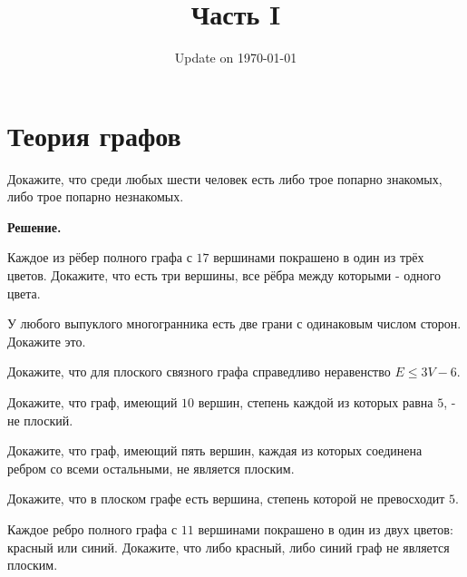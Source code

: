 \documentclass[12pt]{article}
\begin{document}
\fontsize{12}{12}\selectfont

\title{\bf \huge Часть I}
\date{Update on \today}
\maketitle 



\section*{Теория графов}

\begin{task}
Докажите, что среди любых шести человек есть либо трое попарно знакомых, либо трое попарно незнакомых.
\end{task}

\noindent\textbf{Решение.} 

\begin{task}
Каждое из рёбер полного графа с $17$ вершинами покрашено в один из трёх цветов. Докажите, что есть три вершины, все рёбра между которыми - одного цвета.
\end{task}

\begin{task}
У любого выпуклого многогранника есть две грани с одинаковым числом сторон. Докажите это.
\end{task}

\begin{task}
Докажите, что для плоского связного графа справедливо неравенство  $E \leqslant  3V - 6$.
\end{task}

\begin{task}
Докажите, что граф, имеющий $10$ вершин, степень каждой из которых равна $5$, - не плоский.    
\end{task}

\begin{task}
Докажите, что граф, имеющий пять вершин, каждая из которых соединена ребром со всеми остальными, не является плоским.
\end{task}

\begin{task}
Докажите, что в плоском графе есть вершина, степень которой не превосходит $5$. 
\end{task}

\begin{task}
Каждое ребро полного графа с $11$ вершинами покрашено в один из двух цветов: красный или синий. Докажите, что либо красный, либо синий граф не является плоским.
\end{task}
\end{document}
